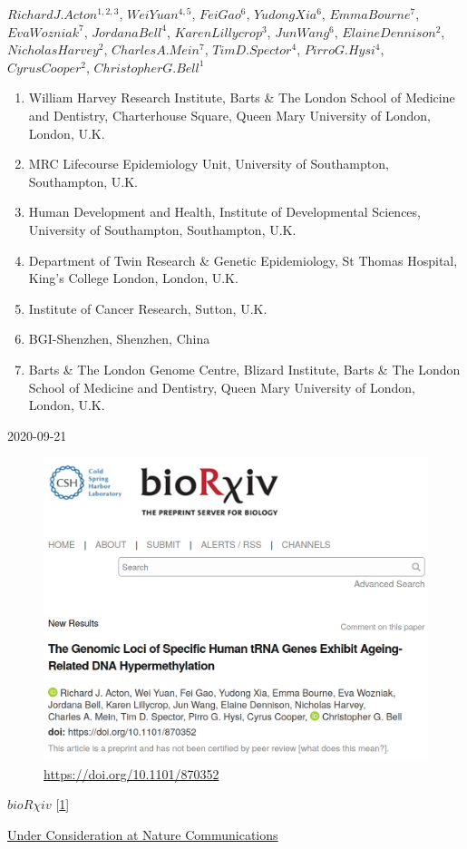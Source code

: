 \documentclass[
]{book}
\providecommand{\tightlist}{%
  \setlength{\itemsep}{0pt}\setlength{\parskip}{0pt}}
\begin{document}
\(Richard J. Acton ^{1,2,3}\), \(Wei Yuan ^{4,5}\), \(Fei Gao ^{6}\), \(Yudong Xia ^{6}\), \(Emma Bourne ^{7}\), \(Eva Wozniak ^{7}\), \(Jordana Bell ^{4}\), \(Karen Lillycrop ^{3}\), \(Jun Wang ^{6}\), \(Elaine Dennison ^{2}\), \(Nicholas Harvey ^{2}\), \(Charles A. Mein ^{7}\), \(Tim D. Spector ^{4}\), \(Pirro G. Hysi ^{4}\), \(Cyrus Cooper ^{2}\), \(Christopher G. Bell ^{1}\)

\begin{enumerate}
\def\labelenumi{\arabic{enumi}.}
\tightlist
\item
  William Harvey Research Institute, Barts \& The London School of Medicine and Dentistry, Charterhouse Square, Queen Mary University of London, London, U.K.
\item
  MRC Lifecourse Epidemiology Unit, University of Southampton, Southampton, U.K.
\item
  Human Development and Health, Institute of Developmental Sciences, University of Southampton, Southampton, U.K.\\
\item
  Department of Twin Research \& Genetic Epidemiology, St Thomas Hospital, King's College London, London, U.K.
\item
  Institute of Cancer Research, Sutton, U.K.
\item
  BGI-Shenzhen, Shenzhen, China
\item
  Barts \& The London Genome Centre, Blizard Institute, Barts \& The London School of Medicine and Dentistry, Queen Mary University of London, London, U.K.
\end{enumerate}

2020-09-21

\begin{figure}
\centering
\includegraphics{figs/biorxiv_screenshot.png}
\caption{\url{https://doi.org/10.1101/870352}}
\end{figure}

\href{https://doi.org/10.1101/870352}{\(bioR \chi iv\)} {[}\protect\hyperlink{ref-Acton2020}{1}{]}

\href{https://nature-research-under-consideration.nature.com/users/37265-nature-communications/posts/57741-the-genomic-loci-of-specific-human-trna-genes-exhibit-ageing-related-dna-hypermethylation}{Under Consideration at Nature Communications}
\end{document}
